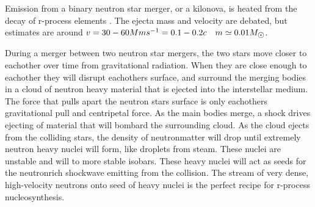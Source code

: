 Emission from a binary neutron star merger, or a kilonova, is heated from the decay of r-process elements . The ejecta mass and velocity are debated, but estimates are around $v=30-60 Mms^{-1} = 0.1-0.2c \quad m \simeq 0.01 \msol$.

During a merger between two neutron star mergers, the two stars move closer to eachother over time from gravitational radiation. When they are close enough to eachother they will disrupt eachothers surface, and surround the merging bodies in a cloud of neutron heavy material that is ejected into the interstellar medium. The force that pulls apart the neutron stars surface is only eachothers gravitational pull and centripetal force.
As the main bodies merge, a shock drives ejecting of material that will bombard the surrounding cloud.
As the cloud ejects from the colliding stars, the density of neutronmatter will drop until extremely neutron heavy nuclei will form, like droplets from steam. These nuclei are unstable and will \betadecay to more stable isobars. These heavy nuclei will act as seeds for the neutronrich shockwave emitting from the collision. The stream of very dense, high-velocity neutrons onto seed of heavy nuclei is the perfect recipe for r-process nucleosynthesis.

